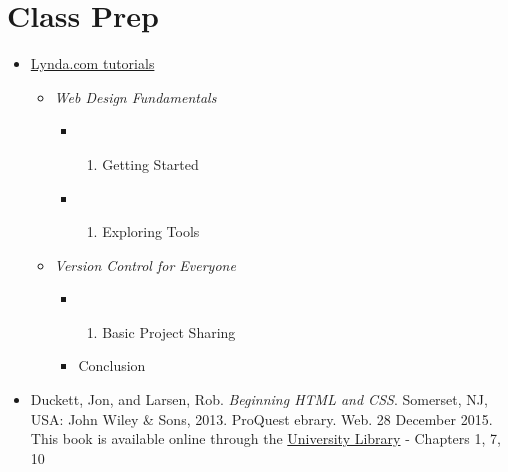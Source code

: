 \documentclass[]{book}
\providecommand{\tightlist}{%
  \setlength{\itemsep}{0pt}\setlength{\parskip}{0pt}}
\begin{document}
\section{Class Prep}\label{week02-prep}

\begin{itemize}
\item
  \href{http://www.lynda.com/SharedPlaylist/2b710369c9ec4d8c964467225c6610ad?org=unm.edu}{Lynda.com
  tutorials}

  \begin{itemize}
  \tightlist
  \item
    \emph{Web Design Fundamentals}

    \begin{itemize}
    \item
      \begin{enumerate}
      \def\labelenumi{\arabic{enumi}.}
      \setcounter{enumi}{2}
      \tightlist
      \item
        Getting Started
      \end{enumerate}
    \item
      \begin{enumerate}
      \def\labelenumi{\arabic{enumi}.}
      \setcounter{enumi}{3}
      \tightlist
      \item
        Exploring Tools
      \end{enumerate}
    \end{itemize}
  \item
    \emph{Version Control for Everyone}

    \begin{itemize}
    \item
      \begin{enumerate}
      \def\labelenumi{\arabic{enumi}.}
      \setcounter{enumi}{4}
      \tightlist
      \item
        Basic Project Sharing
      \end{enumerate}
    \item
      Conclusion
    \end{itemize}
  \end{itemize}
\item
  Duckett, Jon, and Larsen, Rob. \emph{Beginning HTML and CSS}.
  Somerset, NJ, USA: John Wiley \& Sons, 2013. ProQuest ebrary. Web. 28
  December 2015. This book is available online through the
  \href{http://site.ebrary.com.libproxy.unm.edu/lib/unma/detail.action?docID=10667426}{University
  Library} - Chapters 1, 7, 10
\end{itemize}
\end{document}
